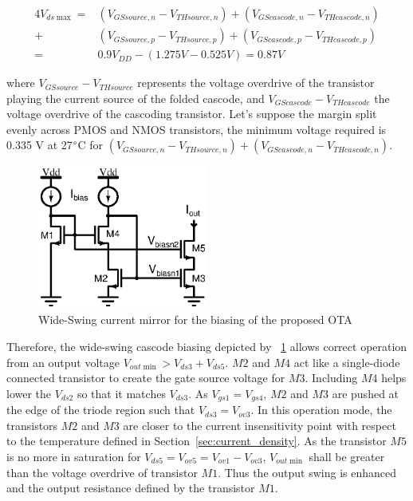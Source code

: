 \begin{eqnarray}
    4V_{ds\max} =& (V_{GSsource,n}-V_{THsource,n}) + (V_{GScascode,n}-V_{THcascode,n}) \\
    +& (V_{GSsource,p}-V_{THsource,p}) + (V_{GScascode,p}-V_{THcascode,p}) \nonumber \\
    =& 0.9 V_{DD} - (1.275 V - 0.525 V) = 0.87 V \nonumber
\end{eqnarray}

where \(V_{GSsource}-V_{THsource} \) represents the voltage overdrive of the transistor playing the current source of the folded cascode, and \(V_{GScascode}-V_{THcascode}\) the voltage overdrive of the cascoding transistor. Let's suppose the margin split evenly across PMOS and NMOS transistors, the minimum voltage required is 0.335 V at 27\(\degree \)C for \((V_{GSsource,n}-V_{THsource,n}) + (V_{GScascode,n}-V_{THcascode,n})\).

\begin{figure}[htp]
    \centering
    \includegraphics[width=0.5\textwidth]{Chapter7/Figs/wide-swing-current-mirror.ps}
    \caption{Wide-Swing current mirror for the biasing of the proposed OTA}
    \label{fig:wide-swing-cascode}
\end{figure}

Therefore, the wide-swing cascode biasing depicted by \figurename~\ref{fig:wide-swing-cascode} allows correct operation from an output voltage \(V_{out\min} > V_{ds3}+V_{ds5}\). \(M2 \) and \(M4 \) act like a single-diode connected transistor to create the gate source voltage for \(M3 \). Including \(M4 \) helps lower the \(V_{ds2} \) so that it matches \(V_{ds3} \). As \(V_{gs1} = V_{gs4} \), \(M2 \) and \(M3 \) are pushed at the edge of the triode region such that \(V_{ds3} = V_{ov3}\). In this operation mode, the transistors \(M2 \) and \(M3 \) are closer to the current insensitivity point with respect to the temperature defined in Section~\ref{sec:current_density}. As the transistor \(M5 \) is no more in saturation for \(V_{ds5} = V_{ov5} = V_{ov1} - V_{ov3}\), \(V_{out\min} \) shall be greater than the voltage overdrive of transistor \(M1 \). Thus the output swing is enhanced and the output resistance defined by the transistor \(M1 \).

